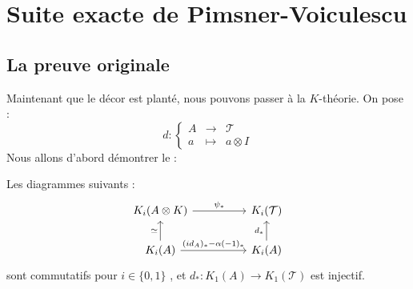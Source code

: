 \section{Suite exacte de Pimsner-Voiculescu}
\subsection{La preuve originale}

Maintenant que le décor est planté, nous pouvons passer à la $K$-théorie. 
On pose :  \[d : \left\{\begin{array}{rcl}A & \rightarrow & \mathcal T \\ a & \mapsto & a\otimes I\end{array}\right.\]
Nous allons d'abord démontrer le :

\begin{lem}\label{diagramme}
Les diagrammes suivants :
\[\begin{tikzcd}[column sep = huge]
K_i(A\otimes K) \arrow{r}{\psi_*}& K_i(\mathcal T) \\
K_i(A)   \arrow{u}{\simeq}\arrow{r}{(id_A)_*-\alpha(-1)_*}& K_i(A) \arrow{u}{d_*}
\end{tikzcd}
\]
sont commutatifs pour $i\in\{0,1\}$ , et $d_* : K_1(A)\rightarrow K_1(\mathcal T)$ est injectif.
\end{lem}

